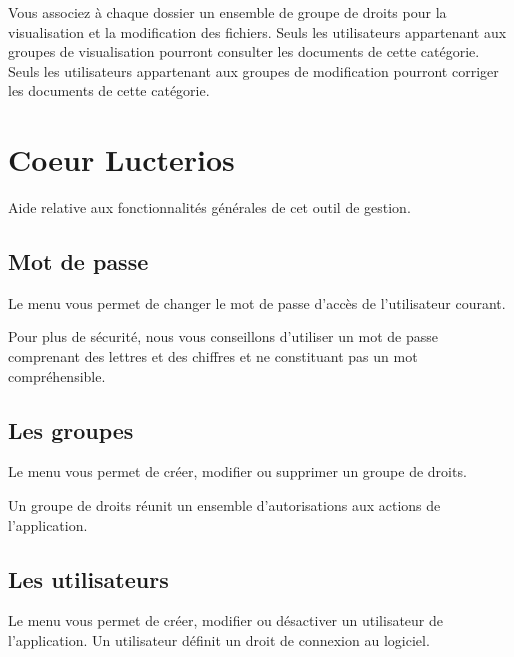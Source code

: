 \documentclass[a4paper,10pt,oneside,french]{sphinxmanual}
\begin{document}
Vous associez à chaque dossier un ensemble de groupe de droits pour la visualisation et la modification des fichiers. Seuls les utilisateurs appartenant aux groupes de visualisation pourront consulter les documents de cette catégorie. Seuls les utilisateurs appartenant aux groupes de modification pourront corriger les documents de cette catégorie.


\chapter{Coeur Lucterios}
\label{\detokenize{CORE/index:coeur-lucterios}}\label{\detokenize{CORE/index::doc}}
Aide relative aux fonctionnalités générales de cet outil de gestion.


\section{Mot de passe}
\label{\detokenize{CORE/password:mot-de-passe}}\label{\detokenize{CORE/password::doc}}
Le menu  vous permet de changer le mot de passe d’accès de l’utilisateur courant.

\noindent{}

Pour plus de sécurité, nous vous conseillons d’utiliser un mot de passe comprenant des lettres et des chiffres et ne constituant pas un mot compréhensible.


\section{Les groupes}
\label{\detokenize{CORE/groups:les-groupes}}\label{\detokenize{CORE/groups::doc}}
Le menu  vous permet de créer, modifier ou supprimer un groupe de droits.

\noindent{}

Un groupe de droits réunit un ensemble d’autorisations aux actions de l’application.

\noindent{}


\section{Les utilisateurs}
\label{\detokenize{CORE/users:les-utilisateurs}}\label{\detokenize{CORE/users::doc}}
Le menu  vous
permet de créer, modifier ou désactiver un utilisateur de l’application. Un
utilisateur définit un droit de connexion au logiciel.
\end{document}
